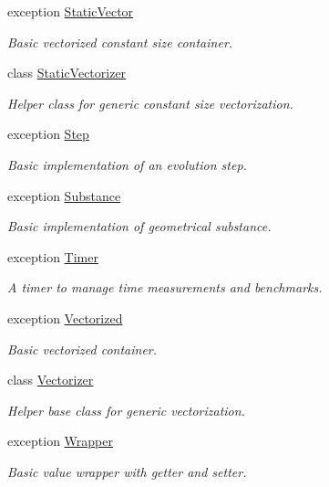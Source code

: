 \begin{DoxyCompactItemize}
exception \hyperlink{exceptionmagrathea_1_1StaticVector}{Static\-Vector}
\begin{DoxyCompactList}\small\item\em Basic vectorized constant size container. \end{DoxyCompactList}\item 
class \hyperlink{classmagrathea_1_1StaticVectorizer}{Static\-Vectorizer}
\begin{DoxyCompactList}\small\item\em Helper class for generic constant size vectorization. \end{DoxyCompactList}\item 
exception \hyperlink{exceptionmagrathea_1_1Step}{Step}
\begin{DoxyCompactList}\small\item\em Basic implementation of an evolution step. \end{DoxyCompactList}\item 
exception \hyperlink{exceptionmagrathea_1_1Substance}{Substance}
\begin{DoxyCompactList}\small\item\em Basic implementation of geometrical substance. \end{DoxyCompactList}\item 
exception \hyperlink{exceptionmagrathea_1_1Timer}{Timer}
\begin{DoxyCompactList}\small\item\em A timer to manage time measurements and benchmarks. \end{DoxyCompactList}\item 
exception \hyperlink{exceptionmagrathea_1_1Vectorized}{Vectorized}
\begin{DoxyCompactList}\small\item\em Basic vectorized container. \end{DoxyCompactList}\item 
class \hyperlink{classmagrathea_1_1Vectorizer}{Vectorizer}
\begin{DoxyCompactList}\small\item\em Helper base class for generic vectorization. \end{DoxyCompactList}\item 
exception \hyperlink{exceptionmagrathea_1_1Wrapper}{Wrapper}
\begin{DoxyCompactList}\small\item\em Basic value wrapper with getter and setter. \end{DoxyCompactList}\end{DoxyCompactItemize}

